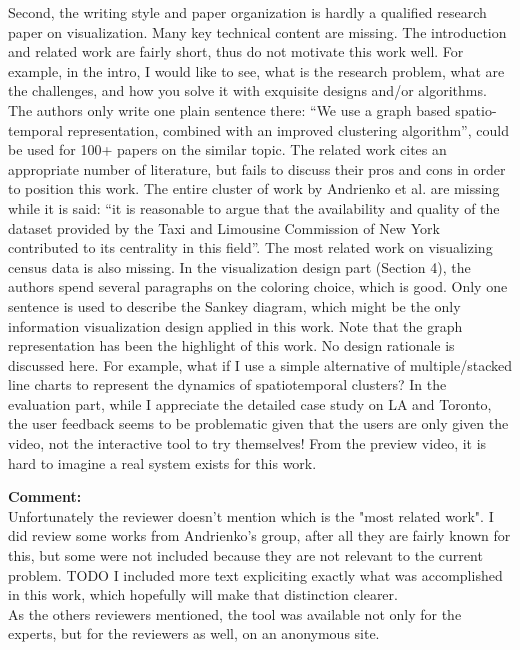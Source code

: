 \documentclass{article}
\newcommand{\reply}[1]{\begin{tcolorbox}\noindent\textbf{Comment:}\\#1\hfill\end{tcolorbox}}
\begin{document}
\begin{itemize}
{    Second, the writing style and paper organization is hardly a qualified
    research paper on visualization. Many key technical content are missing. The
    introduction and related work are fairly short, thus do not motivate this
    work well. For example, in the intro, I would like to see, what is the
    research problem, what are the challenges, and how you solve it with
    exquisite designs and/or algorithms. The authors only write one plain
    sentence there: ``We use a graph based spatio- temporal representation,
    combined with an improved clustering algorithm'', could be used for 100+
    papers on the similar topic. The related work cites an appropriate number of
    literature, but fails to discuss their pros and cons in order to position
    this work. The entire cluster of work by Andrienko et al. are missing while
    it is said: ``it is reasonable to argue that the availability and quality of
    the dataset provided by the Taxi and Limousine Commission of New York
    contributed to its centrality in this field''. The most related work on
    visualizing census data is also missing. In the visualization design part
    (Section 4), the authors spend several paragraphs on the coloring choice,
    which is good. Only one sentence is used to describe the Sankey diagram,
    which might be the only information visualization design applied in this
    work. Note that the graph representation has been the highlight of this
    work. No design rationale is discussed here. For example, what if I use a
    simple alternative of multiple/stacked line charts to represent the dynamics
    of spatiotemporal clusters? In the evaluation part, while I appreciate the
    detailed case study on LA and Toronto, the user feedback seems to be
    problematic given that the users are only given the video, not the
    interactive tool to try themselves! From the preview video, it is hard to
    imagine a real system exists for this work.

    \reply{Unfortunately the reviewer doesn't mention which is the "most related
    work". I did review some works from Andrienko's group, after all they are
    fairly known for this, but some were not included because they are not
    relevant to the current problem. TODO I included more text expliciting
    exactly what was accomplished in this work, which hopefully will make that
    distinction clearer. \\ As the others reviewers mentioned, the tool was
    available not only for the experts, but for the reviewers as well, on an
    anonymous site.}

}
\end{itemize}
\end{document}
